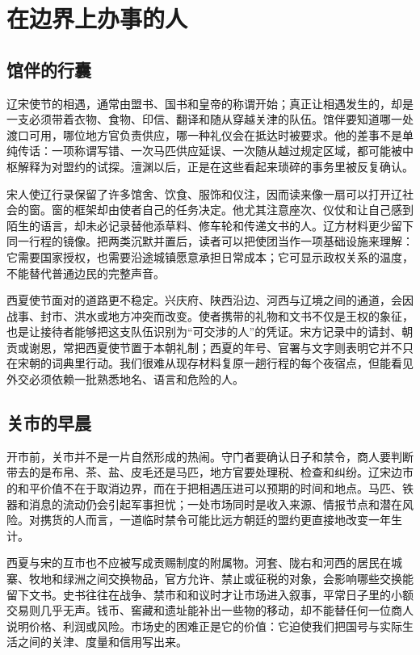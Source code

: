 \section{在边界上办事的人}

\subsection{馆伴的行囊}

辽宋使节的相遇，通常由盟书、国书和皇帝的称谓开始；真正让相遇发生的，却是一支必须带着衣物、食物、印信、翻译和随从穿越关津的队伍。馆伴要知道哪一处渡口可用，哪位地方官负责供应，哪一种礼仪会在抵达时被要求。他的差事不是单纯传话：一项称谓写错、一次马匹供应延误、一次随从越过规定区域，都可能被中枢解释为对盟约的试探。澶渊以后，正是在这些看起来琐碎的事务里被反复确认。

宋人使辽行录保留了许多馆舍、饮食、服饰和仪注，因而读来像一扇可以打开辽社会的窗。窗的框架却由使者自己的任务决定。他尤其注意座次、仪仗和让自己感到陌生的语言，却未必记录替他添草料、修车轮和传递文书的人。辽方材料更少留下同一行程的镜像。把两类沉默并置后，读者可以把使团当作一项基础设施来理解：它需要国家授权，也需要沿途城镇愿意承担日常成本；它可显示政权关系的温度，不能替代普通边民的完整声音。

西夏使节面对的道路更不稳定。兴庆府、陕西沿边、河西与辽境之间的通道，会因战事、封市、洪水或地方冲突而改变。使者携带的礼物和文书不仅是王权的象征，也是让接待者能够把这支队伍识别为“可交涉的人”的凭证。宋方记录中的请封、朝贡或谢恩，常把西夏使节置于本朝礼制；西夏的年号、官署与文字则表明它并不只在宋朝的词典里行动。我们很难从现存材料复原一趟行程的每个夜宿点，但能看见外交必须依赖一批熟悉地名、语言和危险的人。

\subsection{关市的早晨}

开市前，关市并不是一片自然形成的热闹。守门者要确认日子和禁令，商人要判断带去的是布帛、茶、盐、皮毛还是马匹，地方官要处理税、检查和纠纷。辽宋边市的和平价值不在于取消边界，而在于把相遇压进可以预期的时间和地点。马匹、铁器和消息的流动仍会引起军事担忧；一处市场同时是收入来源、情报节点和潜在风险。对携货的人而言，一道临时禁令可能比远方朝廷的盟约更直接地改变一年生计。

西夏与宋的互市也不应被写成贡赐制度的附属物。河套、陇右和河西的居民在城寨、牧地和绿洲之间交换物品，官方允许、禁止或征税的对象，会影响哪些交换能留下文书。史书往往在战争、禁市和和议时才让市场进入叙事，平常日子里的小额交易则几乎无声。钱币、窖藏和遗址能补出一些物的移动，却不能替任何一位商人说明价格、利润或风险。市场史的困难正是它的价值：它迫使我们把国号与实际生活之间的关津、度量和信用写出来。

